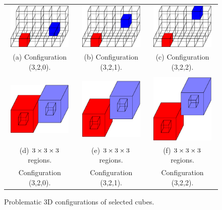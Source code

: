 \begin{figure}
\centering

\begin{tabular}{ccc}
\includegraphics[width=1.2in]{images/config3D_3_2_0.eps} \qquad &
\qquad
\includegraphics[width=1.2in]{images/config3D_3_2_1.eps}
\qquad &
\qquad
\includegraphics[width=1.2in]{images/config3D_3_2_2.eps} \\
(a) Configuration (3,2,0). & (b) Configuration (3,2,1). 
  & (c) Configuration (3,2,2).\\
\\
\includegraphics[width=1.2in]{images/config3D_3_2_0_3x3x3.eps} \qquad &
\qquad
\includegraphics[width=1.2in]{images/config3D_3_2_1_3x3x3.eps}
\qquad &
\qquad
\includegraphics[width=1.2in]{images/config3D_3_2_2_3x3x3.eps} \\
(d) $3 \times 3 \times 3$ regions. & (e) $3 \times 3 \times 3$ regions.
  & (f) $3 \times 3 \times 3$ regions.\\
Configuration (3,2,0). & Configuration (3,2,1). 
  & Configuration (3,2,2).
\end{tabular}
\caption{Problematic 3D configurations of selected cubes.}
\label{fig:loose3D}
\end{figure}

